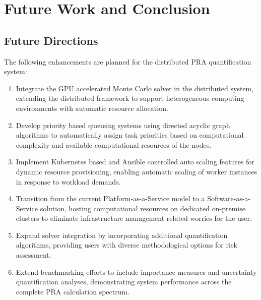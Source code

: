 \chapter{Future Work and Conclusion}
\section{Future Directions}

The following enhancements are planned for the distributed PRA quantification system:

\begin{enumerate}
    \item Integrate the GPU accelerated Monte Carlo solver in the distributed system, extending the distributed framework to support heterogeneous computing environments with automatic resource allocation.

    \item Develop priority based queueing systems using directed acyclic graph algorithms to automatically assign task priorities based on computational complexity and available computational resources of the nodes.

    \item Implement Kubernetes based and Ansible controlled auto scaling features for dynamic resource provisioning, enabling automatic scaling of worker instances in response to workload demands.


    \item Transition from the current Platform-as-a-Service model to a Software-as-a-Service solution, hosting computational resources on dedicated on-premise clusters to eliminate infrastructure management related worries for the user.

    \item Expand solver integration by incorporating additional quantification algorithms, providing users with diverse methodological options for risk assessment.

    \item Extend benchmarking efforts to include importance measures and uncertainty quantification analyses, demonstrating system performance across the complete PRA calculation spectrum.
\end{enumerate}

